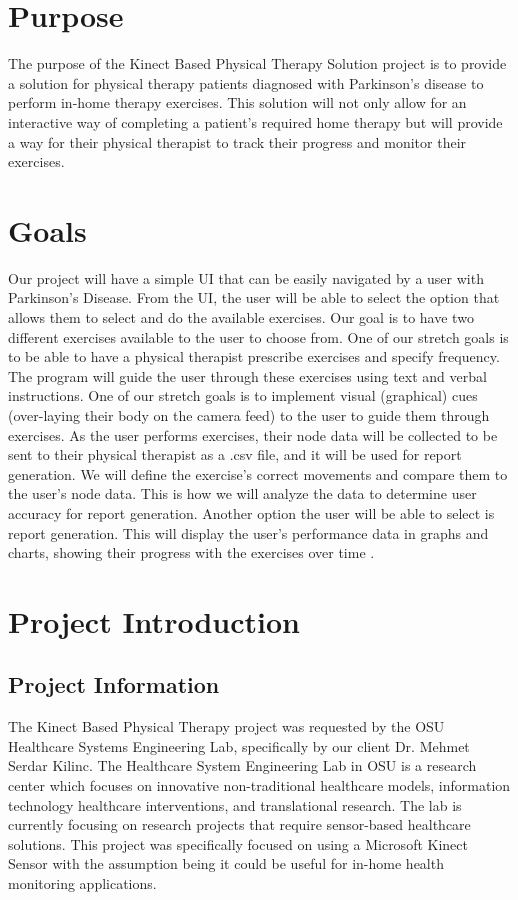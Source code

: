 \documentclass[onecolumn, draftclsnofoot,10pt, compsoc]{IEEEtran}
\begin{document}
\section{Purpose}
The purpose of the Kinect Based Physical Therapy Solution project is to provide a solution for physical therapy patients diagnosed with Parkinson's disease to perform in-home therapy exercises. This solution will not only allow for an interactive way of completing a patient's required home therapy but will provide a way for their physical therapist to track their progress and monitor their exercises.

\section{Goals}
Our project will have a simple UI that can be easily navigated by a user with Parkinson's Disease. From the UI, the user will be able to select the option that allows them to select and do the available exercises. Our goal is to have two different exercises available to the user to choose from. One of our stretch goals is to be able to have a physical therapist prescribe exercises and specify frequency. The program will guide the user through these exercises using text and verbal instructions. One of our stretch goals is to implement visual (graphical) cues (over-laying their body on the camera feed) to the user to guide them through exercises. As the user performs exercises, their node data will be collected to be sent to their physical therapist as a .csv file, and it will be used for report generation. We will define the exercise's correct movements and compare them to the user's node data. This is how we will analyze the data to determine user accuracy for report generation. Another option the user will be able to select is report generation. This will display the user's performance data in graphs and charts, showing their progress with the exercises over time \cite{csvFile, Gestures}. 

\section{Project Introduction}
\subsection{Project Information}
The Kinect Based Physical Therapy project was requested by the OSU Healthcare Systems Engineering Lab, specifically by our client Dr. Mehmet Serdar Kilinc. The Healthcare System Engineering Lab in OSU is a research center which focuses on innovative non-traditional healthcare models, information technology healthcare interventions, and translational research. The lab is currently focusing on research projects that require sensor-based healthcare solutions. This project was specifically focused on using a Microsoft Kinect Sensor with the assumption being it could be useful for in-home health monitoring applications.
\end{document}
